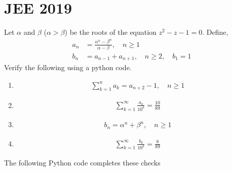 \documentclass[journal,12pt,twocolumn]{IEEEtran}
\renewcommand\thesection{\arabic{section}}
\begin{document}
\section{JEE 2019}
\noindent Let $\alpha$ and $\beta$ ($\alpha > \beta$) be the roots of the
equation $z^2 - z - 1 = 0$. Define,
\begin{align}
	a_n &= \frac{\alpha^{n}-\beta^{n}}{\alpha - \beta}, \quad n \ge 1
	\\
	b_n &= a_{n-1} + a_{n+1}, \quad n \ge 2, \quad b_1 =1
	\label{eq:10-orig-diff}
\end{align}
Verify the following using a python code.
\begin{enumerate}[label=\thesection.\arabic*
,ref=\thesection.\theenumi]
\item 
\begin{align}
	\sum_{k=1}^{n}a_k = a_{n+2}-1, \quad n \ge 1
\end{align}
 \item 
\begin{align}
	\sum_{k=1}^{\infty}\frac{a_k}{10^k} =\frac{10}{89}
\end{align}
 \item 
\begin{align}
	b_n =\alpha^n + \beta^n, \quad n \ge 1
\end{align}
 \item 
\begin{align}
	\sum_{k=1}^{\infty}\frac{b_k}{10^k} =\frac{8}{89}
\end{align}
\end{enumerate}
The following Python code completes these checks

\end{document}
